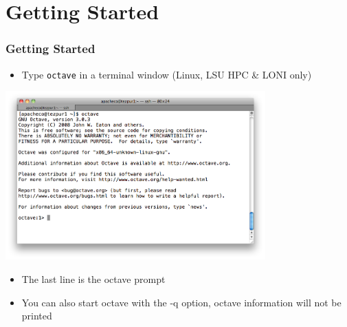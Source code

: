 \documentclass[t,compress,xcolor=svgnames]{beamer}
\begin{document}
\section{Getting Started}
\begin{frame}%
  \frametitle{\small Getting Started}
  \begin{itemize}
    \item Type \texttt{octave} in a terminal window (Linux, LSU HPC \& LONI only)
  \end{itemize}
  \begin{center}
    \includegraphics[width=0.75\textwidth,clip=true]{octave-startup}
  \end{center}
  \begin{itemize}
    \item The last line is the octave prompt
    \item You can also start octave with the -q option, octave information will not be printed
  \end{itemize}
\end{frame}
\end{document}
